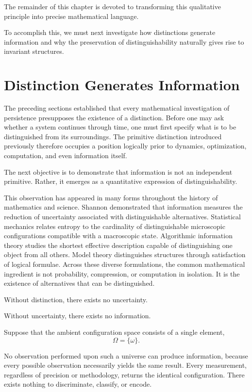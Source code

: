 \documentclass[11pt]{book}
\numberwithin{equation}{chapter}
\theoremstyle{definition}
\theoremstyle{plain}
\begin{document}
The remainder of this chapter is devoted to transforming this qualitative principle into precise mathematical language.

To accomplish this, we must next investigate how distinctions generate information and why the preservation of distinguishability naturally gives rise to invariant structures.

\section{Distinction Generates Information}

The preceding sections established that every mathematical investigation of persistence presupposes the existence of a distinction. Before one may ask whether a system continues through time, one must first specify what is to be distinguished from its surroundings. The primitive distinction introduced previously therefore occupies a position logically prior to dynamics, optimization, computation, and even information itself.

The next objective is to demonstrate that information is not an independent primitive. Rather, it emerges as a quantitative expression of distinguishability.

This observation has appeared in many forms throughout the history of mathematics and science. Shannon demonstrated that information measures the reduction of uncertainty associated with distinguishable alternatives. Statistical mechanics relates entropy to the cardinality of distinguishable microscopic configurations compatible with a macroscopic state. Algorithmic information theory studies the shortest effective description capable of distinguishing one object from all others. Model theory distinguishes structures through satisfaction of logical formulae. Across these diverse formulations, the common mathematical ingredient is not probability, compression, or computation in isolation. It is the existence of alternatives that can be distinguished.

Without distinction, there exists no uncertainty.

Without uncertainty, there exists no information.

Suppose that the ambient configuration space consists of a single element,
\[
\Omega=\{\omega\}.
\]

No observation performed upon such a universe can produce information, because every possible observation necessarily yields the same result. Every measurement, regardless of precision or methodology, returns the identical configuration. There exists nothing to discriminate, classify, or encode.
\end{document}
